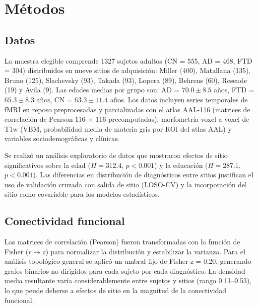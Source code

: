 \documentclass[12pt,a4paper]{article}
\begin{document}

\section{Métodos}

\subsection{Datos}

La muestra elegible comprende 1327 sujetos adultos (CN = 555, AD = 468, FTD = 304) distribuidos en nueve sitios de adquisición: Miller (400), Matallana (135), Bruno (125), Slachevsky (93), Takada (93), Lopera (89), Behrens (60), Resende (19) y Avila (9). Las edades medias por grupo son: AD = $70.0 \pm 8.5$ años, FTD = $65.3 \pm 8.3$ años, CN = $63.3 \pm 11.4$ años. Los datos incluyen series temporales de fMRI en reposo preprocesadas y parcializadas con el atlas AAL-116\cite{tzourio2002} (matrices de correlación de Pearson 116 $\times$ 116 precomputadas), morfometría voxel a voxel de T1w (VBM, probabilidad media de materia gris por ROI del atlas AAL) y variables sociodemográficas y clínicas.

Se realizó un análisis exploratorio de datos que mostraron efectos de sitio significativos sobre la edad ($H = 312.4$, $p < 0.001$) y la educación ($H = 287.1$, $p < 0.001$). Las diferencias en distribución de diagnósticos entre sitios justifican el uso de validación cruzada con salida de sitio (LOSO-CV) y la incorporación del sitio como covariable para los modelos estadísticos\cite{combat}.

\subsection{Conectividad funcional}

Las matrices de correlación (Pearson) fueron transformadas con la función de Fisher ($r \to z$) para normalizar la distribución y estabilizar la varianza. Para el análisis topológico general se
aplicó un umbral fijo de Fisher-z = 0.20, generando grafos binarios no dirigidos para cada sujeto por cada diagnóstico. La densidad media resultante varía considerablemente entre sujetos y sitios (rango 0.11--0.53), lo que peude deberse a efectos de sitio en la magnitud de la conectividad funcional.
\end{document}
